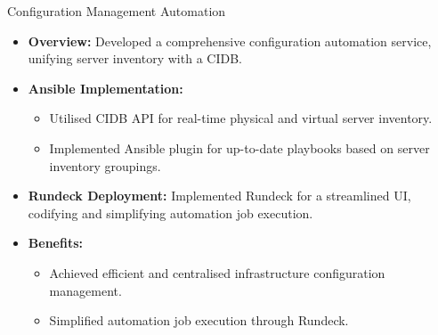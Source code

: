 \documentclass[10pt]{beamer}
\begin{document}
  \begin{frame}{Configuration Management Automation}
    \begin{itemize}
      \item \textbf{Overview:} Developed a comprehensive configuration automation
      service, unifying server inventory with a CIDB.
  
      \item \textbf{Ansible Implementation:}
        \begin{itemize}
          \item Utilised CIDB API for real-time physical and virtual server inventory.
          \item Implemented Ansible plugin for up-to-date playbooks based on server
          inventory groupings.
        \end{itemize}
  
      \item \textbf{Rundeck Deployment:} Implemented Rundeck for a streamlined UI,
      codifying and simplifying automation job execution.
  
      \item \textbf{Benefits:}
        \begin{itemize}
          \item Achieved efficient and centralised infrastructure configuration
          management.
          \item Simplified automation job execution through Rundeck.
        \end{itemize}
    \end{itemize}
  \end{frame}
\end{document}
